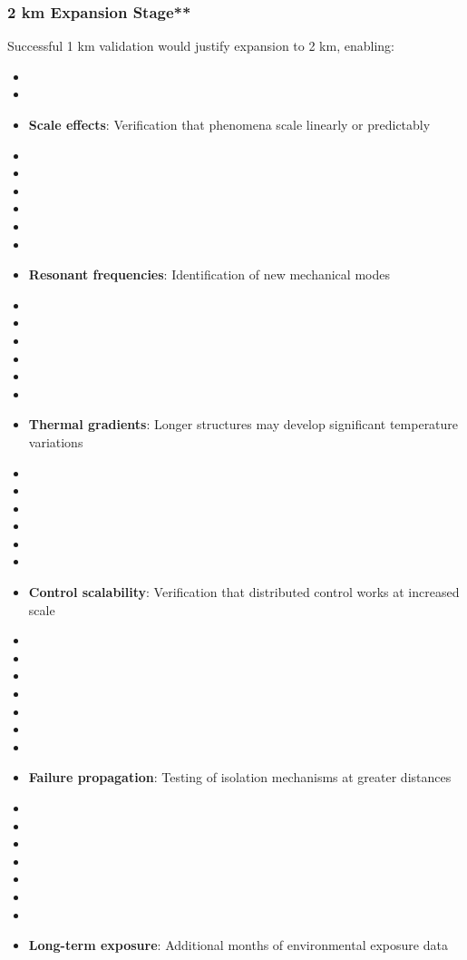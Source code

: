 \subsubsection{2 km Expansion Stage**}
Successful 1 km validation would justify expansion to 2 km, enabling:
\begin{itemize}
    \item \item \item \textbf{Scale effects}: Verification that phenomena scale linearly or predictably \cite{barenblatt2003}
    \item \item \item \item \item \item \item \textbf{Resonant frequencies}: Identification of new mechanical modes \cite{meirovitch2001}
    \item \item \item \item \item \item \item \textbf{Thermal gradients}: Longer structures may develop significant temperature variations \cite{incropera2006}
    \item \item \item \item \item \item \item \textbf{Control scalability}: Verification that distributed control works at increased scale \cite{antsaklis2007}
    \item \item \item \item \item \item \item \item \textbf{Failure propagation}: Testing of isolation mechanisms at greater distances \cite{sales2011}
    \item \item \item \item \item \item \item \item \textbf{Long-term exposure}: Additional months of environmental exposure data \cite{rouse2013}
\end{itemize}

